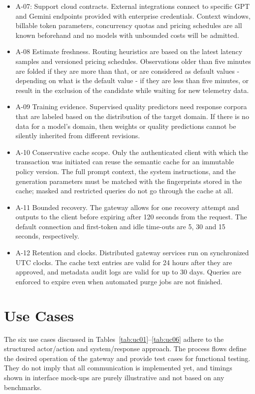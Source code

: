 \documentclass{FastFyp}
\begin{document}
\begin{itemize}
\item A-07: Support cloud contracts. External integrations connect to specific GPT and Gemini endpoints provided with enterprise credentials. Context windows, billable token parameters, concurrency quotas and pricing schedules are all known beforehand and no models with unbounded costs will be admitted.
\item A-08 Estimate freshness. Routing heuristics are based on the latest latency samples and versioned pricing schedules. Observations older than five minutes are folded if they are more than that, or are considered as default values - depending on what is the default value - if they are less than five minutes, or result in the exclusion of the candidate while waiting for new telemetry data.
\item A-09 Training evidence. Supervised quality predictors need response corpora that are labeled based on the distribution of the target domain. If there is no data for a model's domain, then weights or quality predictions cannot be silently inherited from different revisions.
\item A-10 Conservative cache scope. Only the authenticated client with which the transaction was initiated can reuse the semantic cache for an immutable policy version. The full prompt context, the system instructions, and the generation parameters must be matched with the fingerprints stored in the cache; masked and restricted queries do not go through the cache at all.
\item A-11 Bounded recovery. The gateway allows for one recovery attempt and outputs to the client before expiring after 120 seconds from the request. The default connection and first-token and idle time-outs are 5, 30 and 15 seconds, respectively.
\item A-12 Retention and clocks. Distributed gateway services run on synchronized UTC clocks. The cache text entries are valid for 24 hours after they are approved, and metadata audit logs are valid for up to 30 days. Queries are enforced to expire even when automated purge jobs are not finished.
\end{itemize}

\section{Use Cases}
\label{sec:use-cases}
The six use cases discussed in Tables~\ref{tab:uc01}--\ref{tab:uc06} adhere to the structured actor/action and system/response approach. The process flows define the desired operation of the gateway and provide test cases for functional testing. They do not imply that all communication is implemented yet, and timings shown in interface mock-ups are purely illustrative and not based on any benchmarks.
\end{document}
